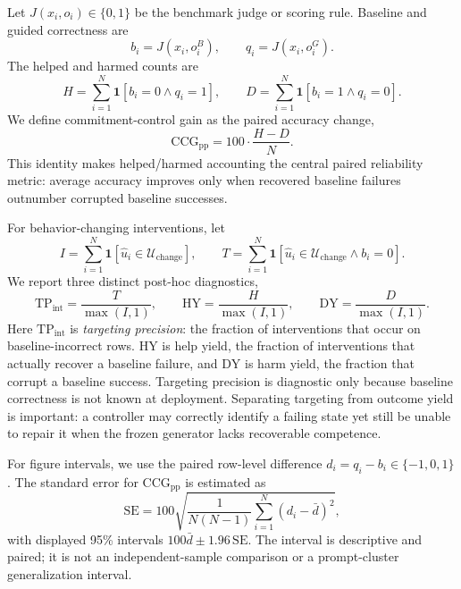 \documentclass[11pt]{article}
\begin{document}
Let \(J(x_i,o_i)\in\{0,1\}\) be the benchmark judge or scoring rule. Baseline and guided correctness are
\begin{equation}
b_i=J(x_i,o_i^B),\qquad q_i=J(x_i,o_i^G).
\end{equation}
The helped and harmed counts are
\begin{equation}
H=\sum_{i=1}^{N}\mathbf{1}[b_i=0\land q_i=1],\qquad
D=\sum_{i=1}^{N}\mathbf{1}[b_i=1\land q_i=0].
\end{equation}
We define commitment-control gain as the paired accuracy change,
\begin{equation}
\mathrm{CCG}_{\mathrm{pp}}=100\cdot\frac{H-D}{N}.
\end{equation}
This identity makes helped/harmed accounting the central paired reliability metric: average accuracy improves only when recovered baseline failures outnumber corrupted baseline successes.

For behavior-changing interventions, let
\begin{equation}
I=\sum_{i=1}^{N}\mathbf{1}[\hat{u}_i\in\mathcal{U}_{\mathrm{change}}],\qquad
T=\sum_{i=1}^{N}\mathbf{1}[\hat{u}_i\in\mathcal{U}_{\mathrm{change}}\land b_i=0].
\end{equation}
We report three distinct post-hoc diagnostics,
\begin{equation}
\mathrm{TP}_{\mathrm{int}}=\frac{T}{\max(I,1)},\qquad
\mathrm{HY}=\frac{H}{\max(I,1)},\qquad
\mathrm{DY}=\frac{D}{\max(I,1)}.
\end{equation}
Here \(\mathrm{TP}_{\mathrm{int}}\) is \emph{targeting precision}: the fraction of interventions that occur on baseline-incorrect rows. \(\mathrm{HY}\) is help yield, the fraction of interventions that actually recover a baseline failure, and \(\mathrm{DY}\) is harm yield, the fraction that corrupt a baseline success. Targeting precision is diagnostic only because baseline correctness is not known at deployment. Separating targeting from outcome yield is important: a controller may correctly identify a failing state yet still be unable to repair it when the frozen generator lacks recoverable competence.

For figure intervals, we use the paired row-level difference \(d_i=q_i-b_i\in\{-1,0,1\}\). The standard error for \(\mathrm{CCG}_{\mathrm{pp}}\) is estimated as
\begin{equation}
\mathrm{SE}=100\sqrt{\frac{1}{N(N-1)}\sum_{i=1}^{N}\left(d_i-\bar{d}\right)^2},
\end{equation}
with displayed 95\% intervals \(100\bar{d}\pm1.96\,\mathrm{SE}\). The interval is descriptive and paired; it is not an independent-sample comparison or a prompt-cluster generalization interval.
\end{document}
